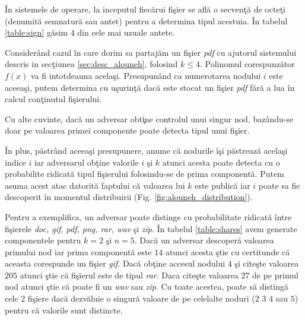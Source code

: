 \documentclass{llncs}
\begin{document}
\^{I}n sistemele de operare, la inceputul fiec\u{a}rui fi\c{s}ier se afl\u{a} o secven\c{t}\u{a} de octe\c{t}i (denumit\u{a} semnatur\u{a} sau antet) pentru a determina tipul acestuia. \^{I}n tabelul {\ref{table:sign}} g\u{a}sim $4$ din cele mai uzuale antete.

Consider\^{a}nd cazul \^{i}n care dorim sa partaj\u{a}m un fi\c{s}ier \textit{pdf} cu ajutorul sistemului descris in sec\c{t}iunea \ref{sec:desc_alouneh}, folosind $k \leq 4$. Polinomul corespunz\u{a}tor $f(x)$ va fi intotdeauna acela\c{s}i. Presupun\^{a}nd ca numerotarea nodului $i$ este aceea\c{s}i, putem determina cu u\c{s}urin\c{t}\u{a} dac\u{a} este stocat un fi\c{s}ier \textit{pdf} f\u{a}r\u{a} a lua \^{i}n calcul con\c{t}inutul fi\c{s}ierului.

Cu alte cuvinte, dac\u{a} un adversar obt\c{i}ne controlul unui singur nod, baz\^{a}ndu-se doar pe valoarea primei componente poate detecta tipul unui fi\c{s}ier.

\^{I}n plus, p\u{a}str\^{a}nd aceea\c{s}i presupunere, anume c\u{a} nodurile \^{i}\c{s}i p\u{a}streaz\u{a} acela\c{s}i indice $i$ iar adversarul ob\c{t}ine valorile $i$ \c{s}i $k$ atunci acesta poate detecta cu o probabilite ridicat\u{a} tipul fi\c{s}ierului folosindu-se de prima component\u{a}. Putem asuma acest atac datorit\u{a} faptului c\u{a} valoarea lui $k$ este public\u{a} iar $i$ poate sa fie descoperit \^{i}n momentul distribuirii (Fig. \ref{fig:alouneh_distribution}).

Pentru a exemplifica, un adversar poate distinge cu probabilitate ridicat\u{a} \^{i}ntre fi\c{s}ierele \textit{doc, gif, pdf, png, rar, wav} \c{s}i \textit{zip}. \^{I}n tabelul {\ref{table:shares}} avem generate componentele pentru $k = 2$ \c{s}i $n = 5$.
Dac\u{a} un adversar descoper\u{a} valoarea primului nod iar prima component\u{a} este $14$ atunci acesta \c{s}tie cu certitunde c\u{a} aceasta corespunde un fi\c{s}ier \textit{gif}. Dac\u{a} ob\c{t}ine accesul nodului $4$ \c{s}i cite\c{s}te valoarea $205$ atunci \c{s}tie c\u{a} fi\c{s}ierul este de tipul \textit{rar}. Daca cite\c{s}te valoarea $27$ de pe primul nod atunci \c{s}tie c\u{a} poate fi un \textit{wav} sau \textit{zip}. Cu toate acestea, poate s\u{a} disting\u{a} cele 2 fi\c{s}iere dac\u{a} dezv\u{a}luie o singur\u{a} valoare de pe celelalte noduri ($2$ $3$ $4$ sau $5$) pentru c\u{a} valorile sunt distincte.
\end{document}

